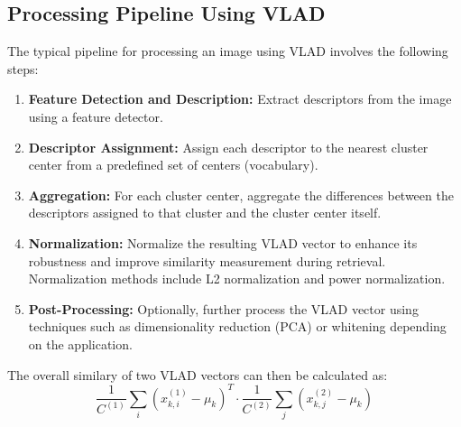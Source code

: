 \subsection*{Processing Pipeline Using VLAD}
The typical pipeline for processing an image using VLAD involves the following steps:
\begin{enumerate}
\item \textbf{Feature Detection and Description:} Extract descriptors from the image using a feature detector.
\item \textbf{Descriptor Assignment:} Assign each descriptor to the nearest cluster center from a predefined set of centers (vocabulary).
\item \textbf{Aggregation:} For each cluster center, aggregate the differences between the descriptors assigned to that cluster and the cluster center itself.
\item \textbf{Normalization:} Normalize the resulting VLAD vector to enhance its robustness and improve similarity measurement during retrieval. Normalization methods include L2 normalization and power normalization.
\item \textbf{Post-Processing:} Optionally, further process the VLAD vector using techniques such as dimensionality reduction (PCA) or whitening depending on the application.
\end{enumerate}

The overall similary of two VLAD vectors can then be calculated as:
\begin{equation}
    \frac{1}{C^{(1)}} \sum_i (x_{k,i}^{(1)} - \mu_k)^T \cdot \frac{1}{C^{(2)}} \sum_j (x_{k,j}^{(2)} - \mu_k)
\end{equation}



